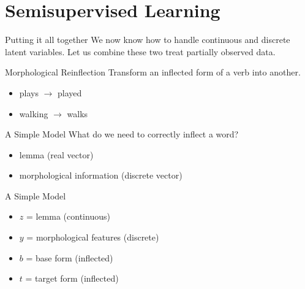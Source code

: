 \documentclass[14pt]{beamer}
\begin{document}
\section{Semisupervised Learning}

\begin{frame}{Putting it all together}
We now know how to handle continuous and discrete latent variables. Let us combine these two treat partially observed data.
\pause
\begin{block}{Morphological Reinflection}
Transform an inflected form of a verb into another.
\begin{itemize}
\pause
\item plays $ \rightarrow $ played
\pause
\item walking $ \rightarrow $ walks
\end{itemize}
\end{block}
\end{frame}

\begin{frame}{A Simple Model \citep{ZhouNeubig:2017}}
What do we need to correctly inflect a word?
\pause
\begin{itemize}
\item lemma \pause (real vector)
\pause
\item morphological information \pause (discrete vector)
\end{itemize}
\end{frame}

\begin{frame}{A Simple Model \citep{ZhouNeubig:2017}}
\begin{figure}
\center
{}
\end{figure}
\begin{itemize}
\item $ z $ = lemma (continuous)
\item $ y $ = morphological features (discrete)
\item $ b $ = base form (inflected)
\item $ t $ = target form (inflected)
\end{itemize}
\end{frame}
\end{document}
